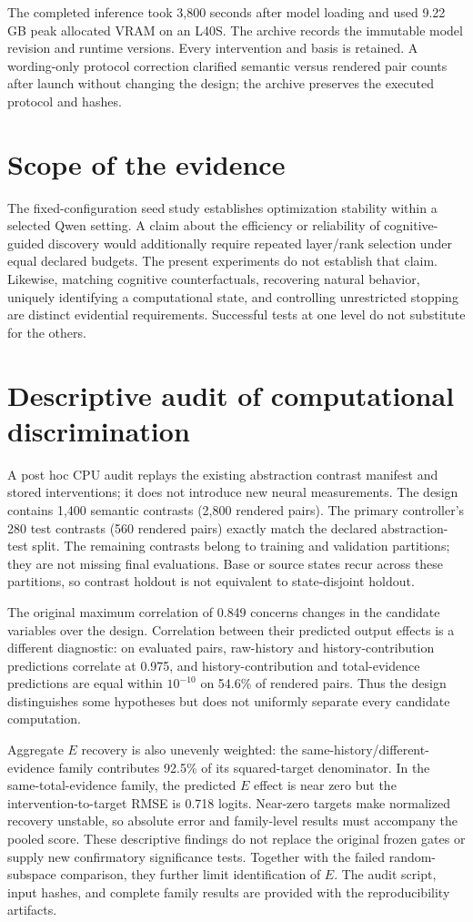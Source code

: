 \documentclass{article}
\begin{document}
The completed inference took 3,800 seconds after model loading and used 9.22 GB peak allocated VRAM on an L40S. The archive records the immutable model revision and runtime versions. Every intervention and basis is retained. A wording-only protocol correction clarified semantic versus rendered pair counts after launch without changing the design; the archive preserves the executed protocol and hashes.

\section{Scope of the evidence}
The fixed-configuration seed study establishes optimization stability within a selected Qwen setting. A claim about the efficiency or reliability of cognitive-guided discovery would additionally require repeated layer/rank selection under equal declared budgets. The present experiments do not establish that claim. Likewise, matching cognitive counterfactuals, recovering natural behavior, uniquely identifying a computational state, and controlling unrestricted stopping are distinct evidential requirements. Successful tests at one level do not substitute for the others.

\clearpage
\section{Descriptive audit of computational discrimination}\label{app:discrimination}
A post hoc CPU audit replays the existing abstraction contrast manifest and stored interventions; it does not introduce new neural measurements. The design contains 1,400 semantic contrasts (2,800 rendered pairs). The primary controller's 280 test contrasts (560 rendered pairs) exactly match the declared abstraction-test split. The remaining contrasts belong to training and validation partitions; they are not missing final evaluations. Base or source states recur across these partitions, so contrast holdout is not equivalent to state-disjoint holdout.

The original maximum correlation of 0.849 concerns changes in the candidate variables over the design. Correlation between their predicted output effects is a different diagnostic: on evaluated pairs, raw-history and history-contribution predictions correlate at 0.975, and history-contribution and total-evidence predictions are equal within $10^{-10}$ on 54.6\% of rendered pairs. Thus the design distinguishes some hypotheses but does not uniformly separate every candidate computation.

Aggregate $E$ recovery is also unevenly weighted: the same-history/different-evidence family contributes 92.5\% of its squared-target denominator. In the same-total-evidence family, the predicted $E$ effect is near zero but the intervention-to-target RMSE is 0.718 logits. Near-zero targets make normalized recovery unstable, so absolute error and family-level results must accompany the pooled score. These descriptive findings do not replace the original frozen gates or supply new confirmatory significance tests. Together with the failed random-subspace comparison, they further limit identification of $E$. The audit script, input hashes, and complete family results are provided with the reproducibility artifacts.
\end{document}
